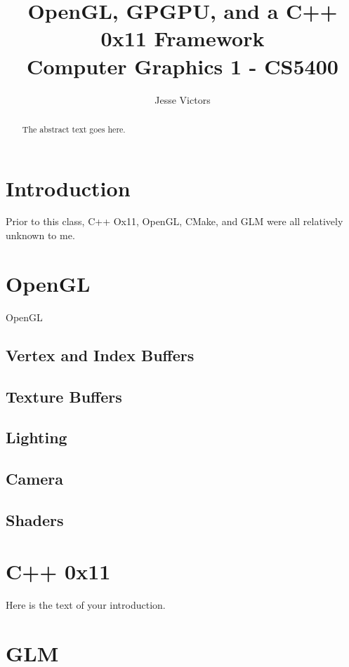 \documentclass[journal]{IEEEtran}
\begin{document}
\title{OpenGL, GPGPU, and a C++ 0x11 Framework \\ \Large Computer Graphics 1 - CS5400}
\author{Jesse Victors}

\maketitle

\begin{abstract}
The abstract text goes here.
\end{abstract}

\section{Introduction}

Prior to this class, C++ Ox11, OpenGL, CMake, and GLM were all relatively unknown to me.

\section{OpenGL}

OpenGL

\subsection{Vertex and Index Buffers}

\subsection{Texture Buffers}

\subsection{Lighting}

\subsection{Camera}

\subsection{Shaders}

\section{C++ 0x11}
Here is the text of your introduction.

\section{GLM}
\end{document}
